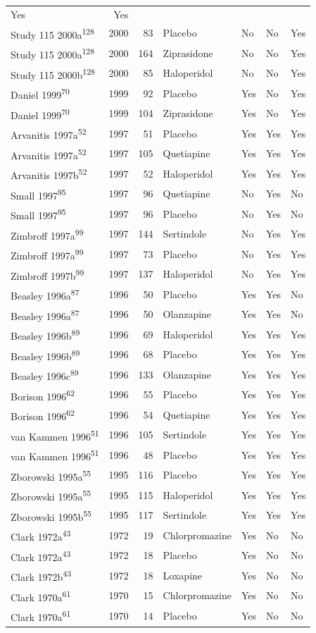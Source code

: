 \documentclass[9pt,english,,jou,floatsintext]{apa6}
\begin{document}
\begin{longtable}[]{@{}lrrllll@{}}
Yes & Yes\tabularnewline
Study 115 2000a\textsuperscript{128} & 2000 & 83 & Placebo & No & No &
Yes\tabularnewline
Study 115 2000a\textsuperscript{128} & 2000 & 164 & Ziprasidone & No &
No & Yes\tabularnewline
Study 115 2000b\textsuperscript{128} & 2000 & 85 & Haloperidol & No & No
& Yes\tabularnewline
Daniel 1999\textsuperscript{70} & 1999 & 92 & Placebo & Yes & No &
Yes\tabularnewline
Daniel 1999\textsuperscript{70} & 1999 & 104 & Ziprasidone & Yes & No &
Yes\tabularnewline
Arvanitis 1997a\textsuperscript{52} & 1997 & 51 & Placebo & Yes & Yes &
Yes\tabularnewline
Arvanitis 1997a\textsuperscript{52} & 1997 & 105 & Quetiapine & Yes &
Yes & Yes\tabularnewline
Arvanitis 1997b\textsuperscript{52} & 1997 & 52 & Haloperidol & Yes &
Yes & Yes\tabularnewline
Small 1997\textsuperscript{95} & 1997 & 96 & Quetiapine & No & Yes &
No\tabularnewline
Small 1997\textsuperscript{95} & 1997 & 96 & Placebo & No & Yes &
No\tabularnewline
Zimbroff 1997a\textsuperscript{99} & 1997 & 144 & Sertindole & No & Yes
& Yes\tabularnewline
Zimbroff 1997a\textsuperscript{99} & 1997 & 73 & Placebo & No & Yes &
Yes\tabularnewline
Zimbroff 1997b\textsuperscript{99} & 1997 & 137 & Haloperidol & No & Yes
& Yes\tabularnewline
Beasley 1996a\textsuperscript{87} & 1996 & 50 & Placebo & Yes & Yes &
No\tabularnewline
Beasley 1996a\textsuperscript{87} & 1996 & 50 & Olanzapine & Yes & Yes &
No\tabularnewline
Beasley 1996b\textsuperscript{89} & 1996 & 69 & Haloperidol & Yes & Yes
& Yes\tabularnewline
Beasley 1996b\textsuperscript{89} & 1996 & 68 & Placebo & Yes & Yes &
Yes\tabularnewline
Beasley 1996c\textsuperscript{89} & 1996 & 133 & Olanzapine & Yes & Yes
& Yes\tabularnewline
Borison 1996\textsuperscript{62} & 1996 & 55 & Placebo & Yes & Yes &
Yes\tabularnewline
Borison 1996\textsuperscript{62} & 1996 & 54 & Quetiapine & Yes & Yes &
Yes\tabularnewline
van Kammen 1996\textsuperscript{51} & 1996 & 105 & Sertindole & Yes &
Yes & Yes\tabularnewline
van Kammen 1996\textsuperscript{51} & 1996 & 48 & Placebo & Yes & Yes &
Yes\tabularnewline
Zborowski 1995a\textsuperscript{55} & 1995 & 116 & Placebo & Yes & Yes &
Yes\tabularnewline
Zborowski 1995a\textsuperscript{55} & 1995 & 115 & Haloperidol & Yes &
Yes & Yes\tabularnewline
Zborowski 1995b\textsuperscript{55} & 1995 & 117 & Sertindole & Yes &
Yes & Yes\tabularnewline
Clark 1972a\textsuperscript{43} & 1972 & 19 & Chlorpromazine & Yes & No
& No\tabularnewline
Clark 1972a\textsuperscript{43} & 1972 & 18 & Placebo & Yes & No &
No\tabularnewline
Clark 1972b\textsuperscript{43} & 1972 & 18 & Loxapine & Yes & No &
No\tabularnewline
Clark 1970a\textsuperscript{61} & 1970 & 15 & Chlorpromazine & Yes & No
& No\tabularnewline
Clark 1970a\textsuperscript{61} & 1970 & 14 & Placebo & Yes & No &
No\tabularnewline
\bottomrule
\end{longtable}
\end{document}
